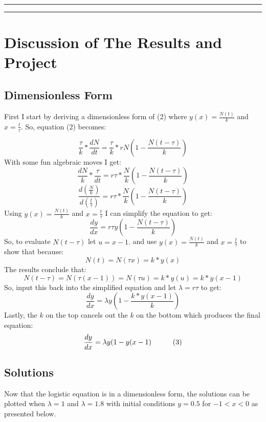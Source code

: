 \documentclass{article}
\begin{document}
\bigskip
\hrule\hrule
\medskip

\section{Discussion of The Results and Project}

\subsection{Dimensionless Form}

\indent \indent First I start by deriving a dimensionless form of (2) where $y(x) = \frac{N(t)}{k}$ and $x = \frac{t}{\tau}$. So, equation (2) becomes:

$$\frac{\tau}{k} * \frac{dN}{dt} = \frac{\tau}{k} *  rN(1-\frac{N(t-\tau)}{k})$$
With some fun algebraic moves I get:
$$\frac{dN}{k} * \frac{\tau}{dt} = r\tau * \frac{N}{k} (1-\frac{N(t-\tau)}{k})$$
$$\frac{d(\frac{N}{k})}{d(\frac{t}{\tau})} = r\tau * \frac{N}{k} (1-\frac{N(t-\tau)}{k})$$
Using $y(x) = \frac{N(t)}{k}$ and $x = \frac{t}{\tau}$ I can simplify the equation to get:
$$\frac{dy}{dx} = r\tau y(1-\frac{N(t-\tau)}{k})$$
So, to evaluate $N(t-\tau)$ let $u =  x-1.$ and use $y(x) = \frac{N(t)}{k}$ and $x = \frac{t}{\tau}$ to show that because:
$$N(t) = N(\tau x) = k*y(x)$$
The results conclude that:
$$N(t-\tau) = N(\tau(x-1)) = N(\tau u) = k*y(u) = k*y(x-1)$$
So, input this back into the simplified equation and let $\lambda = r\tau$ to get:
$$\frac{dy}{dx} = \lambda y(1-\frac{k*y(x-1)}{k})$$
Lastly, the $k$ on the top cancels out the $k$ on the bottom which produces the final equation:
$$\frac{dy}{dx} = \lambda y(1-y(x-1) \indent\indent (3)$$ 
\subsection{Solutions}
\indent \indent Now that the logistic equation is in a dimensionless form, the solutions can be plotted when $\lambda = 1$ and $\lambda = 1.8$ with initial conditions $y = 0.5$ for $-1 < x < 0$ as presented below.
\end{document}
